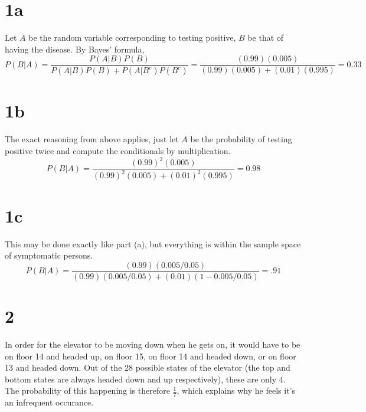 \documentclass{article}
\begin{document}
\section*{1a}
Let $A$ be the random variable corresponding to testing positive, $B$ be that of having the disease.
By Bayes' formula,
\[P(B|A)=\frac{P(A|B)P(B)}{P(A|B)P(B)+P(A|B^{c})P(B^{c})}=\frac{(0.99)(0.005)}{(0.99)(0.005)+(0.01)(0.995)}=0.33\]

\section*{1b}
The exact reasoning from above applies, just let $A$ be the probability of testing positive twice and compute the conditionals by multiplication.
\[P(B|A)=\frac{(0.99)^{2}(0.005)}{(0.99)^{2}(0.005)+(0.01)^{2}(0.995)}=0.98\]

\section*{1c}
This may be done exactly like part (a), but everything is within the sample space of symptomatic persons.
\[P(B|A)=\frac{(0.99)(0.005/0.05)}{(0.99)(0.005/0.05)+(0.01)(1-0.005/0.05)}=.91\]

\section*{2}
In order for the elevator to be moving down when he gets on, it would have to be on floor 14 and headed up, on floor 15, on floor 14 and headed down, or on floor 13 and headed down. Out of the 28 possible states of the elevator (the top and bottom states are always headed down and up respectively), these are only 4. The probability of this happening is therefore $\frac{1}{7}$, which explains why he feels it's an infrequent occurance.
\end{document}
